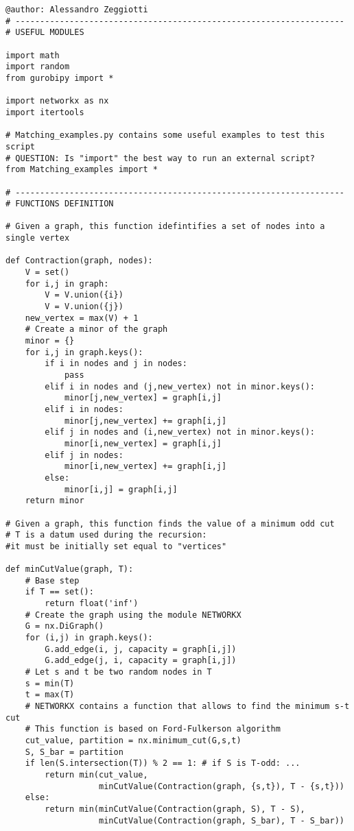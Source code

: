 \begin{verbatim}
@author: Alessandro Zeggiotti
# -------------------------------------------------------------------
# USEFUL MODULES

import math
import random
from gurobipy import *

import networkx as nx
import itertools

# Matching_examples.py contains some useful examples to test this script
# QUESTION: Is "import" the best way to run an external script?
from Matching_examples import *

# -------------------------------------------------------------------
# FUNCTIONS DEFINITION

# Given a graph, this function idefintifies a set of nodes into a single vertex

def Contraction(graph, nodes):
    V = set()
    for i,j in graph:
        V = V.union({i})
        V = V.union({j})
    new_vertex = max(V) + 1
    # Create a minor of the graph
    minor = {}
    for i,j in graph.keys():
        if i in nodes and j in nodes:
            pass
        elif i in nodes and (j,new_vertex) not in minor.keys():
            minor[j,new_vertex] = graph[i,j]
        elif i in nodes:
            minor[j,new_vertex] += graph[i,j]
        elif j in nodes and (i,new_vertex) not in minor.keys():
            minor[i,new_vertex] = graph[i,j]
        elif j in nodes:
            minor[i,new_vertex] += graph[i,j]
        else:
            minor[i,j] = graph[i,j]
    return minor

# Given a graph, this function finds the value of a minimum odd cut
# T is a datum used during the recursion: 
#it must be initially set equal to "vertices"

def minCutValue(graph, T):
    # Base step
    if T == set():
        return float('inf')
    # Create the graph using the module NETWORKX
    G = nx.DiGraph()
    for (i,j) in graph.keys():
        G.add_edge(i, j, capacity = graph[i,j])
        G.add_edge(j, i, capacity = graph[i,j])
    # Let s and t be two random nodes in T
    s = min(T)
    t = max(T)
    # NETWORKX contains a function that allows to find the minimum s-t cut
    # This function is based on Ford-Fulkerson algorithm
    cut_value, partition = nx.minimum_cut(G,s,t)
    S, S_bar = partition
    if len(S.intersection(T)) % 2 == 1: # if S is T-odd: ...
        return min(cut_value,
                   minCutValue(Contraction(graph, {s,t}), T - {s,t}))
    else:
        return min(minCutValue(Contraction(graph, S), T - S),
                   minCutValue(Contraction(graph, S_bar), T - S_bar))


\end{verbatim}
